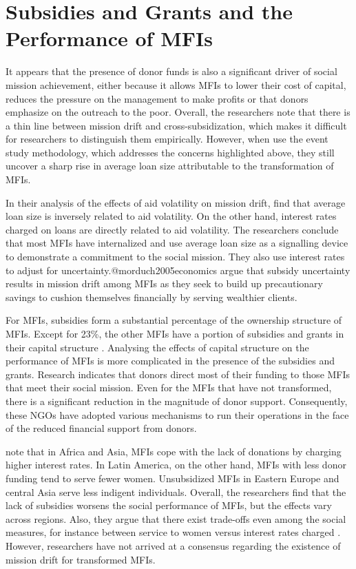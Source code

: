 \documentclass[a4paper,nobind]{templates/ociamthesis}
\begin{document}
\hypertarget{subsidies-and-grants-and-the-performance-of-mfis}{%
\section{Subsidies and Grants and the Performance of MFIs}\label{subsidies-and-grants-and-the-performance-of-mfis}}

\noindent It appears that the presence of donor funds is also a significant driver of social mission achievement, either because it allows MFIs to lower their cost of capital, reduces the pressure on the management to make profits or that donors emphasize on the outreach to the poor. Overall, the researchers note that there is a thin line between mission drift and cross-subsidization, which makes it difficult for researchers to distinguish them empirically. However, when \textcite{d2017ngos} use the event study methodology, which addresses the concerns highlighted above, they still uncover a sharp rise in average loan size attributable to the transformation of MFIs.

In their analysis of the effects of aid volatility on mission drift, \textcite{d2017ngos} find that average loan size is inversely related to aid volatility. On the other hand, interest rates charged on loans are directly related to aid volatility. The researchers conclude that most MFIs have internalized and use average loan size as a signalling device to demonstrate a commitment to the social mission. They also use interest rates to adjust for uncertainty.@morduch2005economics argue that subsidy uncertainty results in mission drift among MFIs as they seek to build up precautionary savings to cushion themselves financially by serving wealthier clients.

For MFIs, subsidies form a substantial percentage of the ownership structure of MFIs. Except for 23\%, the other MFIs have a portion of subsidies and grants in their capital structure \autocite{d2017ngos}. Analysing the effects of capital structure on the performance of MFIs is more complicated in the presence of the subsidies and grants. Research indicates that donors direct most of their funding to those MFIs that meet their social mission. Even for the MFIs that have not transformed, there is a significant reduction in the magnitude of donor support. Consequently, these NGOs have adopted various mechanisms to run their operations in the face of the reduced financial support from donors.

\textcite{d2017ngos} note that in Africa and Asia, MFIs cope with the lack of donations by charging higher interest rates. In Latin America, on the other hand, MFIs with less donor funding tend to serve fewer women. Unsubsidized MFIs in Eastern Europe and central Asia serve less indigent individuals. Overall, the researchers find that the lack of subsidies worsens the social performance of MFIs, but the effects vary across regions. Also, they argue that there exist trade-offs even among the social measures, for instance between service to women versus interest rates charged \autocite{d2013unsubsidized}. However, researchers have not arrived at a consensus regarding the existence of mission drift for transformed MFIs.
\end{document}
